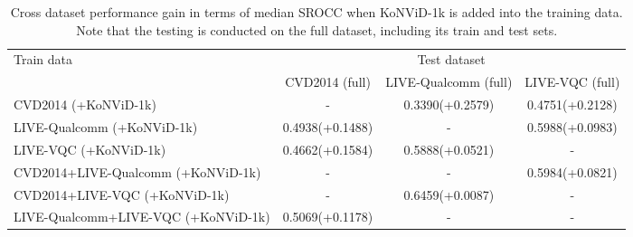 \documentclass[twocolumn]{svjour3}          \smartqed  \usepackage{graphicx}
\begin{document}
\begin{table*}[!thb]
    \centering
    \caption{Cross dataset performance gain in terms of median SROCC when KoNViD-1k is added into the training data. Note that the testing is conducted on the full dataset, including its train and test sets. }
    \label{tab:mixing more datasets-cross}

    \begin{small}
    
\begin{tabular}{lccc}
    \toprule
    \multirow{2}{*}{Train data} & \multicolumn{3}{c}{Test dataset} \\
    & CVD2014 (full) & LIVE-Qualcomm (full) & LIVE-VQC (full) \\
\midrule 
CVD2014 ({\color{blue}+KoNViD-1k})
& -
& 0.3390({\color{blue}+0.2579})
& 0.4751({\color{blue}+0.2128})\\

LIVE-Qualcomm ({\color{blue}+KoNViD-1k})
& 0.4938({\color{blue}+0.1488})
& - 
& 0.5988({\color{blue}+0.0983})\\

LIVE-VQC ({\color{blue}+KoNViD-1k})
& 0.4662({\color{blue}+0.1584})
& 0.5888({\color{blue}+0.0521})
& - \\

CVD2014+LIVE-Qualcomm ({\color{blue}+KoNViD-1k})
& -
& - 
& 0.5984({\color{blue}+0.0821})\\

CVD2014+LIVE-VQC ({\color{blue}+KoNViD-1k})
& -
& 0.6459({\color{blue}+0.0087})
& -\\

LIVE-Qualcomm+LIVE-VQC ({\color{blue}+KoNViD-1k})
& 0.5069({\color{blue}+0.1178})
& -
& -\\

    \bottomrule
    \end{tabular}
\end{small}
\end{table*}
\end{document}
